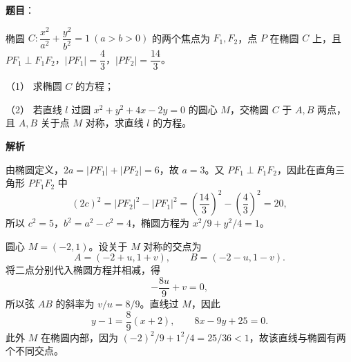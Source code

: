 \begin{answer}

\textbf{题目}：

椭圆 $C:\dfrac{x^2}{a^2}+\dfrac{y^2}{b^2}=1\ (a>b>0)$ 的两个焦点为 $F_1,F_2$，点 $P$ 在椭圆 $C$ 上，且 $PF_1\perp F_1F_2$，$|PF_1|=\dfrac43$，$|PF_2|=\dfrac{14}3$。

（1） 求椭圆 $C$ 的方程；

（2） 若直线 $l$ 过圆 $x^2+y^2+4x-2y=0$ 的圆心 $M$，交椭圆 $C$ 于 $A,B$ 两点，且 $A,B$ 关于点 $M$ 对称，求直线 $l$ 的方程。

\textbf{解析}


由椭圆定义，$2a=|PF_1|+|PF_2|=6$，故 $a=3$。又 $PF_1\perp F_1F_2$，因此在直角三角形 $PF_1F_2$ 中
\nopagebreak[4]
\[
(2c)^2=|PF_2|^2-|PF_1|^2
=\left(\frac{14}3\right)^2-\left(\frac43\right)^2=20,
\]
所以 $c^2=5$，$b^2=a^2-c^2=4$，椭圆方程为 $x^2/9+y^2/4=1$。


圆心 $M=(-2,1)$。设关于 $M$ 对称的交点为
\nopagebreak[4]
\[
A=(-2+u,1+v),\qquad B=(-2-u,1-v).
\]
将二点分别代入椭圆方程并相减，得
\nopagebreak[4]
\[
-\frac{8u}{9}+v=0,
\]
所以弦 $AB$ 的斜率为 $v/u=8/9$。直线过 $M$，因此
\nopagebreak[4]
\[
y-1=\frac89(x+2),\qquad 8x-9y+25=0.
\]
此外 $M$ 在椭圆内部，因为 $(-2)^2/9+1^2/4=25/36<1$，故该直线与椭圆有两个不同交点。



\end{answer}
